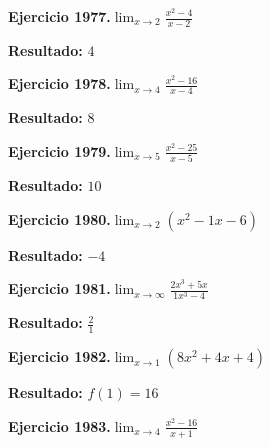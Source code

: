 \documentclass[10pt,a4paper]{article}
\begin{document}
\begin{ejbox}
\textbf{Ejercicio 1977.}\quad $\lim_{x\to 2} \frac{x^2-4}{x-2}$
\end{ejbox}

\begin{solbox}
\textbf{Resultado:} \(\displaystyle 4\)
\end{solbox}

\newpage
\begin{ejbox}
\textbf{Ejercicio 1978.}\quad $\lim_{x\to 4} \frac{x^2-16}{x-4}$
\end{ejbox}

\begin{solbox}
\textbf{Resultado:} \(\displaystyle 8\)
\end{solbox}

\begin{ejbox}
\textbf{Ejercicio 1979.}\quad $\lim_{x\to 5} \frac{x^2-25}{x-5}$
\end{ejbox}

\begin{solbox}
\textbf{Resultado:} \(\displaystyle 10\)
\end{solbox}

\begin{ejbox}
\textbf{Ejercicio 1980.}\quad $\lim_{x\to 2} (x^2 -1x -6)$
\end{ejbox}

\begin{solbox}
\textbf{Resultado:} \(\displaystyle -4\)
\end{solbox}

\newpage
\begin{ejbox}
\textbf{Ejercicio 1981.}\quad $\lim_{x\to \infty} \frac{2x^3 + 5x}{1x^3 - 4}$
\end{ejbox}

\begin{solbox}
\textbf{Resultado:} \(\displaystyle \frac{2}{1}\)
\end{solbox}

\begin{ejbox}
\textbf{Ejercicio 1982.}\quad $\lim_{x\to 1} (8x^2 +4x +4)$
\end{ejbox}

\begin{solbox}
\textbf{Resultado:} \(\displaystyle f(1) = 16\)
\end{solbox}

\begin{ejbox}
\textbf{Ejercicio 1983.}\quad $\lim_{x\to 4} \frac{x^2-16}{x+1}$
\end{ejbox}
\end{document}
